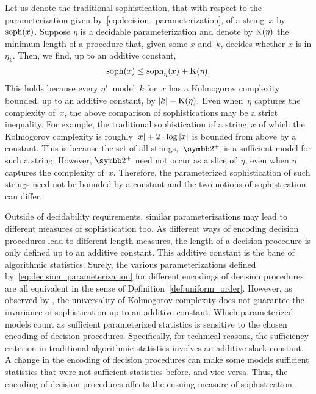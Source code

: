 %
Let us denote the traditional sophistication, that with respect to the parameterization given by~\eqref{eq:decision_parameterization}, of a string~$x$ by $\operatorname{soph}(x)$.
Suppose $\eta$ is a decidable parameterization and denote by $\operatorname{K}(\eta)$ the minimum length of a procedure that, given some $x$ and~$k$, decides whether $x$ is in $\eta_k$.
Then, we find, up to an additive constant,
\begin{equation}
\label{eq:soph}
  \operatorname{soph}(x) \le \operatorname{soph}_\eta(x) + \operatorname{K}(\eta).
\end{equation}
This holds because every $\eta$"~model~$k$ for~$x$ has a Kolmogorov complexity bounded, up to an additive constant, by ${\lvert k\rvert} + \operatorname{K}(\eta)$.
Even when~$\eta$ captures the complexity of~$x$, the above comparison of sophistications may be a strict inequality.
For example, the traditional sophistication of a string~$x$ of which the Kolmogorov complexity is roughly ${\lvert x\rvert} + 2 \cdot \log {\lvert x\rvert}$ is bounded from above by a constant.
This is because the set of all strings,~$\binary^+\!$, is a sufficient model for such a string.
However, $\binary^+$ need not occur as a slice of~$\eta$, even when $\eta$ captures the complexity of~$x$.
Therefore, the parameterized sophistication of such strings need not be bounded by a constant and the two notions of sophistication can differ.

Outside of decidability requirements, similar parameterizations may lead to different measures of sophistication too.
As different ways of encoding decision procedures lead to different length measures, the length of a decision procedure is only defined up to an additive constant.
This additive constant is the bane of algorithmic statistics.
Surely, the various parameterizations defined by~\eqref{eq:decision_parameterization} for different encodings of decision procedures are all equivalent in the sense of Definition~\ref{def:uniform_order}.
However, as observed by \textcite{vereshchagin2009algorithmic,bloem2015two}, the universality of Kolmogorov complexity does not guarantee the invariance of sophistication up to an additive constant.
Which parameterized models count as sufficient parameterized statistics is sensitive to the chosen encoding of decision procedures.
Specifically, for technical reasons, the sufficiency criterion in traditional algorithmic statistics involves an additive slack-constant.
A change in the encoding of decision procedures can make some models sufficient statistics that were not sufficient statistics before, and vice versa.
Thus, the encoding of decision procedures affects the ensuing measure of sophistication.

